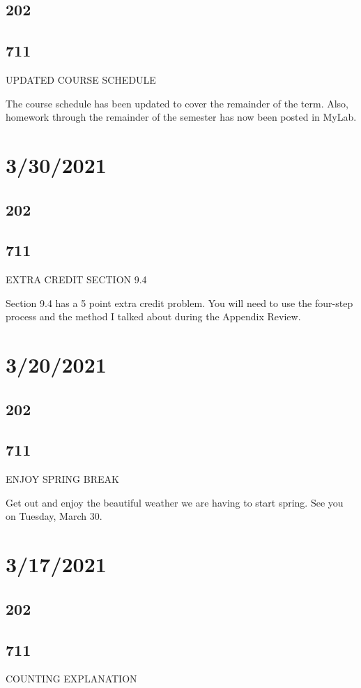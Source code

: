 \documentclass[]{article}
\begin{document}
\subsection*{202}
\subsection*{711}
UPDATED COURSE SCHEDULE

The course schedule has been updated to cover the remainder of the term. Also, homework through the remainder of the semester has now been posted in MyLab.

\section*{3/30/2021}
\subsection*{202}
\subsection*{711}
EXTRA CREDIT SECTION 9.4

Section 9.4 has a 5 point extra credit problem. You will need to use the four-step process and the method I talked about during the Appendix Review.

\section*{3/20/2021}
\subsection*{202}
\subsection*{711}
ENJOY SPRING BREAK

Get out and enjoy the beautiful weather we are having to start spring. See you on Tuesday, March 30.

\section*{3/17/2021}
\subsection*{202}
\subsection*{711}
COUNTING EXPLANATION
\end{document}
